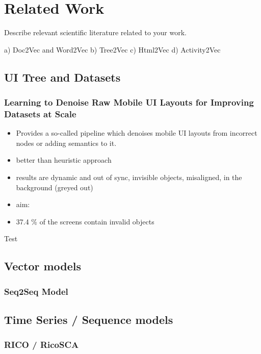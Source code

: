 \chapter{Related Work}

Describe relevant scientific literature related to your work.


 a) Doc2Vec and Word2Vec %
 b) Tree2Vec
 c) Html2Vec
 d) Activity2Vec

\section{UI Tree and Datasets}

\subsection{Learning to Denoise Raw Mobile UI Layouts for Improving
Datasets at Scale}

\begin{itemize}
  \item Provides a so-called  pipeline which denoises mobile UI layouts from incorrect nodes or adding semantics to it.
  \item better than heuristic approach
  \item results are dynamic and out of sync, invisible objects, misaligned, in the background (greyed out)
  \item aim: 
  \item 37.4 \% of the screens contain invalid objects
\end{itemize}

Test \cite{clay}

\section{Vector models}

\subsection{Seq2Seq Model}

\section{Time Series / Sequence models}

\subsection{RICO / RicoSCA}

